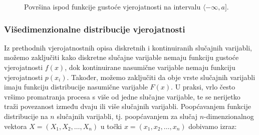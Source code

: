 \documentclass[a4paper,12pt,oneside]{memoir}
\begin{document}
                \begin{figure}[H]
                    \centering
                    \caption{Površina ispod funkcije gustoće vjerojatnosti na intervalu $\langle-\infty,a]$.}
                    \label{fig:44}
                \end{figure}

            \subsubsection{Višedimenzionalne distribucije vjerojatnosti}

                    Iz prethodnih vjerojatnostnih opisa diskretnih i kontinuiranih slučajnih varijabli, možemo zaključiti kako diskretne slučajne varijable nemaju funkciju gustoće vjerojatnosti $f(x)$, dok kontinuirane nasumične varijable nemaju funkciju vjerojatnosti $p(x_i)$. Također, možemo zaključiti da obje vrste slučajnih varijabli imaju funkciju distribucije nasumične varijable $F(x)$. U praksi, vrlo često vršimo promatranja procesa s više od jedne slučajne varijable, te se nerijetko traži povezanost između dvaju ili više slučajnih varijabli. Poopćavanjem funkcije distribucije na $n$ slučajnih varijabli, tj. poopćavanjem za slučaj $n$-dimenzionalnog vektora $X=(X_1,X_2,\ldots,X_n)$ u točki $x=(x_1,x_2,\ldots,x_n)$ dobivamo izraz:
\end{document}

